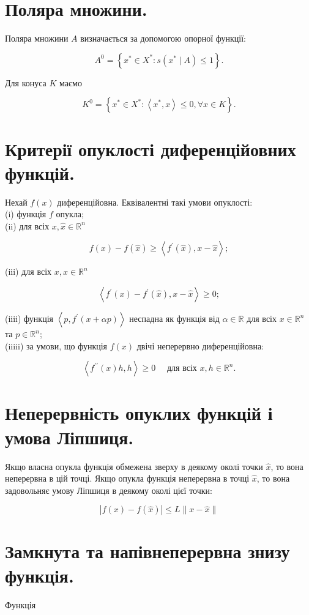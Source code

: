 \documentclass[12pt,a4paper]{extarticle}
\numberwithin{section}{part}
\begin{document}
\section{Поляра множини.}
Поляра множини $A$ визначається за допомогою опорної функції:

$$
A^{0}=\left\{x^{*} \in X^{*}: s\left(x^{*} \mid A\right) \leq 1\right\} .
$$

Для конуса $K$ маємо

$$
K^{0}=\left\{x^{*} \in X^{*}:\left\langle x^{*}, x\right\rangle \leq 0, \forall x \in K\right\} .
$$

\section{Критерії опуклості диференційовних функцій.}
Нехай $f(x)$ диференційовна. Еквівалентні такі умови опуклості:\\
(i) функція $f$ опукла;\\
(ii) для всіх $x, \hat{x} \in \mathbb{R}^{n}$

$$
f(x)-f(\hat{x}) \geq\left\langle f^{\prime}(\hat{x}), x-\hat{x}\right\rangle ;
$$

(iii) для всіх $x, \hat{x} \in \mathbb{R}^{n}$

$$
\left\langle f^{\prime}(x)-f^{\prime}(\hat{x}), x-\hat{x}\right\rangle \geq 0 ;
$$

(iiii) функція $\left\langle p, f^{\prime}(x+\alpha p)\right\rangle$ неспадна як функція від $\alpha \in \mathbb{R}$ для всіх $x \in \mathbb{R}^{n}$ та $p \in \mathbb{R}^{n}$;\\
(iiiii) за умови, що функція $f(x)$ двічі неперервно диференційовна:

$$
\left\langle f^{\prime \prime}(x) h, h\right\rangle \geq 0 \quad \text { для всіх } x, h \in \mathbb{R}^{n} .
$$

\section{Неперервність опуклих функцій і умова Ліпшиця.}
Якщо власна опукла функція обмежена зверху в деякому околі точки $\widehat{x}$, то вона неперервна в цій точці. Якщо опукла функція неперервна в точці $\widehat{x}$, то вона задовольняє умову Ліпшиця в деякому околі цієї точки:

$$
|f(x)-f(\widehat{x})| \leq L\|x-\widehat{x}\|
$$

\section{Замкнута та напівнеперервна знизу функція.}
Функція
\end{document}
